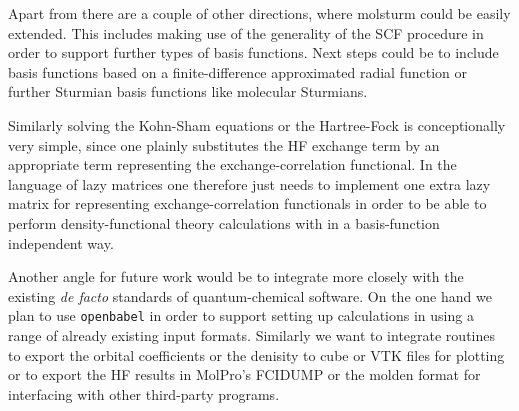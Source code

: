 Apart from \lazyten there are a couple of other directions,
where molsturm could be easily extended.
This includes making use of the generality of the SCF procedure
in order to support further types of basis functions.
Next steps could be to include basis functions based on
a finite-difference approximated radial function or
further Sturmian basis functions like molecular Sturmians.

Similarly solving the Kohn-Sham equations or the Hartree-Fock
is conceptionally very simple,
since one plainly substitutes the HF exchange term by an appropriate
term representing the exchange-correlation functional.
In the language of lazy matrices one therefore just needs to implement
one extra lazy matrix for representing exchange-correlation functionals
in order to be able to perform density-functional theory
calculations with \molsturm in a basis-function independent way.

Another angle for future work would be to integrate more
closely with the existing \emph{de facto} standards of quantum-chemical software.
On the one hand we plan to use \texttt{openbabel} in order to
support setting up calculations in \molsturm using a range of already existing
input formats.
Similarly we want to integrate routines to export
the orbital coefficients or the denisity to cube or VTK files for plotting
or to export the HF results in MolPro's FCIDUMP or the molden format
for interfacing with other third-party programs.
